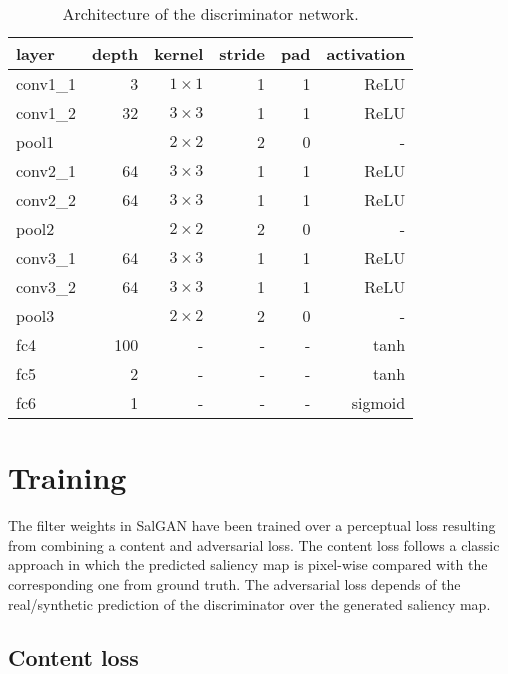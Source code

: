 \documentclass[times,twocolumn,final,authoryear]{elsarticle}
\begin{document}
\begin{table}
\begin{tabular}{lrrrrr}
\hline
layer & depth & kernel & stride & pad & activation \\
\hline
conv1\_1 & 3 & $ 1 \times 1 $ & 1 & 1 & ReLU \\
conv1\_2 & 32 & $ 3 \times 3 $ & 1 & 1 & ReLU \\
pool1 &  & $ 2 \times 2 $ & 2 & 0 & - \\
\hline
conv2\_1 & 64 & $ 3 \times 3 $ & 1 & 1 & ReLU \\
conv2\_2 & 64 & $ 3 \times 3 $ & 1 & 1 & ReLU \\
pool2 &  & $ 2 \times 2 $ & 2 & 0 & - \\
\hline
conv3\_1 & 64 & $ 3 \times 3 $ & 1 & 1 & ReLU \\
conv3\_2 & 64 & $ 3 \times 3 $ & 1 & 1 & ReLU \\
pool3 &  & $ 2 \times 2 $ & 2 & 0 & - \\
\hline
fc4 & 100 & - & - & - & tanh \\
fc5 & 2 & - & - & - & tanh \\
fc6 & 1 & - & - & - & sigmoid \\
\hline
\end{tabular}
\caption{Architecture of the discriminator network.}
\label{tab:discriminator}
\end{table}



\section{Training}
\label{sec:Training}

The filter weights in SalGAN have been trained over a perceptual loss \citep{Johnson2016eccv} resulting from combining a content and adversarial loss. 
The content loss follows a classic approach in which the predicted saliency map is pixel-wise compared with the corresponding one from ground truth.
The adversarial loss depends of the real/synthetic prediction of the discriminator over the generated saliency map.

\subsection{Content loss}
\label{ssec:Content}
\end{document}
